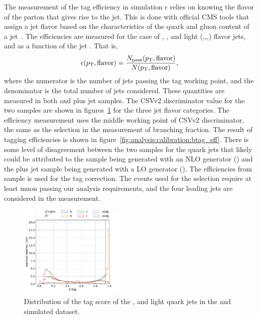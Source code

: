 The measurement of the \PQb tag efficiency in simulation $\epsilon$ relies on knowing the flavor of the parton that gives rise to the jet.  This is done with official CMS tools that assign a jet flavor based on the characteristics of the quark and gluon content of a jet~\cite{twiki:jet_mc_flavor}.  The efficiencies are measured for the case of \PQb, \PQc, and light (\PQu,\PQs,\PQd,\Pg) flavor jets, and as a function of the jet \pt.  That is,
\begin{equation}
    \epsilon(p_{\mathrm{T}}, \mathrm{flavor}) = \frac{ N_{\mathrm{pass}}(p_{\mathrm{T}}, \mathrm{flavor})} {N(p_{\mathrm{T}}, \mathrm{flavor})},
\end{equation}
\noindent where the numerator is the number of jets passing the \PQb tag working point, and the denominator is the total number of jets considered. These quantities are measured in both \ttbar and \PZ plus jet samples. The CSVv2 discriminator value for the two samples are shown in figures~\ref{fig:analysis:calibration:btag_csvv2} for the three jet flavor categories. The efficiency measurement uses the middle working point of CSVv2 discriminator, the same as the selection in the measurement of \PW branching fraction. The result of \PQb tagging efficiencies is shown in figure~\ref{fig:analysis:calibration:btag_eff}.  There is some level of disagreement between the two samples for the \PQb quark jets that likely could be attributed to the \ttbar sample being generated with an NLO generator (\POWHEG) and the \PZ plus jet sample being generated with a LO generator (\MADGRAPH). The efficiencies from \ttbar sample is used for the \PQb tag correction. The events used for the selection require at least muon passing our analysis requirements, and the four leading \pt jets are considered in the measurement.
\begin{figure}[h!]
    \centering
    \includegraphics[width=0.45\textwidth]{chapters/Analysis/sectionCalibration/figures/btag/bmva_mc.pdf}
    \caption{Distribution of the \PQb tag score of the \PQb, \PQc and light quark jets in the \zjets and \ttbar simulated dataset.      
    \label{fig:analysis:calibration:btag_csvv2}}
\end{figure}
